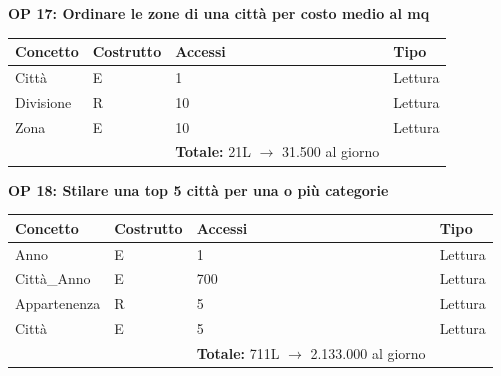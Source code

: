 \documentclass[a4paper,12pt]{report}
\begin{document}
            \textbf{OP 17: Ordinare le zone di una città per costo medio al mq}
        	\begin{table}[H]
            \centering
             \begin{tabular}{llll}
             \rowcolor{yellow!20} \textbf{Concetto} & \textbf{Costrutto} & \textbf{Accessi} & \textbf{Tipo}\\ [0.5ex] 
             \hline
             Città & E & 1 & Lettura \\ 
             Divisione & R & 10 & Lettura \\ 
             Zona & E & 10 & Lettura \\ 
             \hline
                \rowcolor{yellow!20} &   & \textbf{Totale:} 21L $\rightarrow$ 31.500 al giorno &  \\ [1ex] 
             
             \end{tabular}
            \end{table}

            \textbf{OP 18: Stilare una top 5 città per una o più categorie}
        	\begin{table}[H]
            \centering
             \begin{tabular}{llll}
             \rowcolor{yellow!20} \textbf{Concetto} & \textbf{Costrutto} & \textbf{Accessi} & \textbf{Tipo}\\ [0.5ex] 
             \hline
             Anno & E & 1 & Lettura \\ 
             Città\_Anno & E & 700 & Lettura \\ 
             Appartenenza & R & 5 & Lettura \\ 
             Città & E & 5 & Lettura \\ 
             \hline
                \rowcolor{yellow!20} &   & \textbf{Totale:} 711L $\rightarrow$ 2.133.000 al giorno &  \\ [1ex] 
             
             \end{tabular}
            \end{table}
\end{document}
